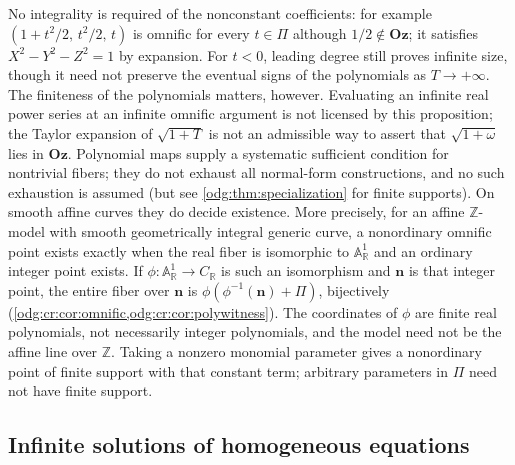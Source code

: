 \documentclass[11pt,oneside]{article}
\numberwithin{equation}{section}
\theoremstyle{definition}
\theoremstyle{remark}
\newcommand{\Oz}{\mathbf{Oz}}
\newcommand{\Z}{\mathbb Z}
\newcommand{\R}{\mathbb R}
\newcommand{\Aff}{\mathbb A}
\begin{document}
No integrality is required of the nonconstant coefficients: for example
$(1+t^2/2,\,t^2/2,\,t)$ is omnific for every $t\in\Pi$ although
$1/2\notin\Oz$; it satisfies $X^2-Y^2-Z^2=1$ by expansion.
For $t<0$, leading degree still proves infinite size, though it need not
preserve the eventual signs of the polynomials as $T\to+\infty$.
The finiteness of the polynomials matters, however.
Evaluating an infinite real power series at an infinite omnific argument is
not licensed by this proposition; the Taylor expansion of $\sqrt{1+T}$ is not
an admissible way to assert that $\sqrt{1+\omega}$ lies in $\Oz$. Polynomial
maps supply a systematic sufficient condition for nontrivial fibers; they do
not exhaust all normal-form constructions, and no such exhaustion is assumed
(but see \cref{odg:thm:specialization} for finite supports). On smooth affine
curves they do decide existence. More precisely, for an affine $\Z$-model
with smooth geometrically integral generic curve, a nonordinary omnific
point exists exactly when the real fiber is isomorphic to $\Aff^1_\R$ and
an ordinary integer point exists. If $\phi:\Aff^1_\R\to C_\R$ is such an
isomorphism and $\mathbf n$ is that integer point, the entire fiber over
$\mathbf n$ is $\phi(\phi^{-1}(\mathbf n)+\Pi)$, bijectively
(\cref{odg:cr:cor:omnific,odg:cr:cor:polywitness}). The coordinates of $\phi$
are finite real polynomials, not necessarily integer polynomials, and the
model need not be the affine line over $\Z$. Taking a nonzero monomial
parameter gives a nonordinary point of finite support with that constant
term; arbitrary parameters in $\Pi$ need not have finite support.

\subsection{Infinite solutions of homogeneous equations}
\end{document}
